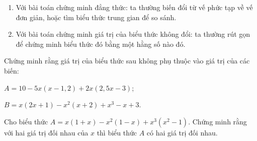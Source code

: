 \begin{dang}
	\begin{enumerate}[\tickEX]
		\item Với bài toán chứng minh đẳng thức: ta thường biến đổi từ vế phức tạp về vế đơn giản, hoặc tìm biểu thức trung gian để so sánh.
		\item Với bài toán chứng minh giá trị của biểu thức không đổi: ta thường rút gọn để chứng minh biểu thức đó bằng một hằng số nào đó.
	\end{enumerate}
\end{dang}
\begin{vd}
Chứng minh rằng giá trị của biểu thức sau không phụ thuộc vào giá trị của các biến:
\begin{enumEX}{2}
\item $ A=10-5x(x-1{,}2)+2x(2{,}5x-3) $;
\item $ B=x(2x+1)-x^{2}(x+2)+x^{3}-x+3 $.
\end{enumEX}
\end{vd}
\begin{vd}
	Cho biểu thức $ A=x(1+x)-x^{2}(1-x)+x^{3}(x^{2}-1) $. Chứng minh rằng với hai giá trị đối nhau của $ x $ thì biểu thức $ A $ có hai giá trị đối nhau.
\end{vd}
